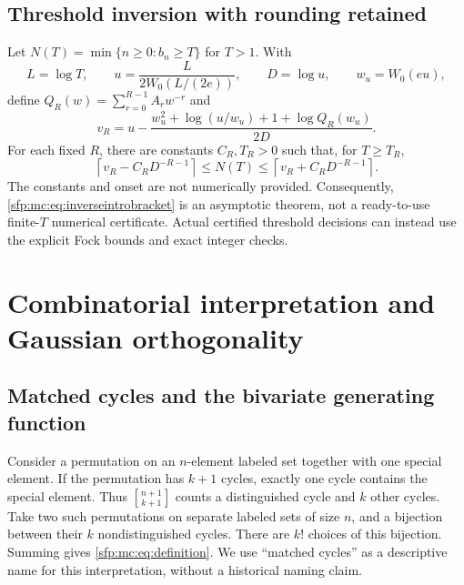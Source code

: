 \documentclass[11pt,letterpaper]{article}
\numberwithin{equation}{section}
\theoremstyle{definition}\newtheorem{definition}[theorem]{Definition}
\theoremstyle{remark}\newtheorem{remark}[theorem]{Remark}
\newcommand{\sone}[2]{\genfrac{[}{]}{0pt}{}{#1}{#2}}
\newcommand{\stir}{\sone}
\newcommand{\ceil}[1]{\left\lceil #1\right\rceil}
\begin{document}
\subsection{Threshold inversion with rounding retained}
Let $N(T)=\min\{n\geq0:b_n\geq T\}$ for $T>1$. With
\begin{equation}\label{sfp:mc:eq:inverseintrodefs}
 L=\log T,\qquad
 u=\frac{L}{2W_0(L/(2e))},\qquad D=\log u,\qquad w_u=W_0(eu),
\end{equation}
define $Q_R(w)=\sum_{r=0}^{R-1}A_rw^{-r}$ and
\begin{equation}\label{sfp:mc:eq:inverseintro}
 v_R=u-\frac{w_u^2+\log(u/w_u)+1+\log Q_R(w_u)}{2D}.
\end{equation}
For each fixed $R$, there are constants $C_R,T_R>0$ such that, for
$T\geq T_R$,
\begin{equation}\label{sfp:mc:eq:inverseintrobracket}
 \ceil{v_R-C_RD^{-R-1}}\leq N(T)
 \leq\ceil{v_R+C_RD^{-R-1}}.
\end{equation}
The constants and onset are not numerically provided. Consequently,
\eqref{sfp:mc:eq:inverseintrobracket} is an asymptotic theorem, not a
ready-to-use finite-$T$ numerical certificate. Actual certified
threshold decisions can instead use the explicit Fock bounds and
exact integer checks.

\section{Combinatorial interpretation and Gaussian orthogonality}
\label{sfp:mc:sec:fock}

\subsection{Matched cycles and the bivariate generating function}
Consider a permutation on an $n$-element labeled set together with
one special element. If the permutation has $k+1$ cycles, exactly
one cycle contains the special element. Thus $\stir{n+1}{k+1}$
counts a distinguished cycle and $k$ other cycles. Take two such
permutations on separate labeled sets of size $n$, and a bijection
between their $k$ nondistinguished cycles. There are $k!$ choices
of this bijection. Summing gives \eqref{sfp:mc:eq:definition}. We use
``matched cycles'' as a descriptive name for this interpretation,
without a historical naming claim.
\end{document}
